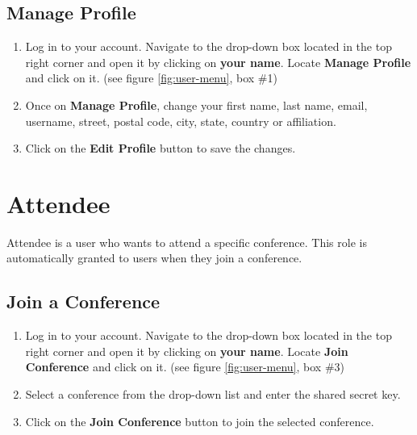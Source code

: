\documentclass[nochapterpage,nopartpage,noheadingspace,numbersubsubsec,bigchapter,colorback,accentcolor=tud9c,10pt]{tudreport}
\begin{document}
	\section{Manage Profile}


\begin{enumerate}
	\item	Log in to your account. Navigate to the drop-down box located in the top right corner and open it by clicking on \textbf{your name}. Locate \textbf{Manage Profile} and click on it. (see figure \ref{fig:user-menu}, box \#1)
	\item	Once on \textbf{Manage Profile}, change your first name, last name, email, username, street, postal code, city, state, country or affiliation.
	\item	Click on the \textbf{Edit Profile} button to save the changes.
\end{enumerate}



  \chapter{Attendee}

Attendee is a user who wants to attend a specific conference. This role is automatically granted to users when they join a conference.

	\section{Join a Conference}


\begin{enumerate}
	\item	Log in to your account. Navigate to the drop-down box located in the top right corner and open it by clicking on \textbf{your name}. Locate  \textbf{Join Conference} and click on it. (see figure \ref{fig:user-menu}, box \#3)
	\item	Select a conference from the drop-down list and enter the shared secret key.
	\item	Click on the \textbf{Join Conference} button to join the selected conference.
\end{enumerate}
\end{document}
